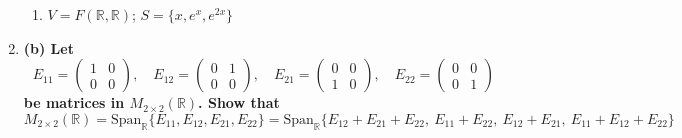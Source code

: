 \documentclass[12pt]{article}
\begin{document}
\begin{enumerate}
\begin{enumerate}[label=(i)]
        \item \( V = F(\mathbb{R}, \mathbb{R}) \); \( S = \{ x, e^x, e^{2x} \} \)
        
        \vspace{2in}
    \end{enumerate}

    \item \textbf{(b) Let}
    \[
    E_{11} = \begin{pmatrix} 1 & 0 \\ 0 & 0 \end{pmatrix}, \quad
    E_{12} = \begin{pmatrix} 0 & 1 \\ 0 & 0 \end{pmatrix}, \quad
    E_{21} = \begin{pmatrix} 0 & 0 \\ 1 & 0 \end{pmatrix}, \quad
    E_{22} = \begin{pmatrix} 0 & 0 \\ 0 & 1 \end{pmatrix}
    \]
    \textbf{be matrices in \( M_{2 \times 2}(\mathbb{R}) \). Show that}
    \[
    M_{2 \times 2}(\mathbb{R}) = \text{Span}_{\mathbb{R}}\{ E_{11}, E_{12}, E_{21}, E_{22} \} = \text{Span}_{\mathbb{R}}\{ E_{12} + E_{21} + E_{22}, \ E_{11} + E_{22}, \ E_{12} + E_{21}, \ E_{11} + E_{12} + E_{22} \}
    \]
    
    \vspace{3in}

\end{enumerate}
\end{document}
